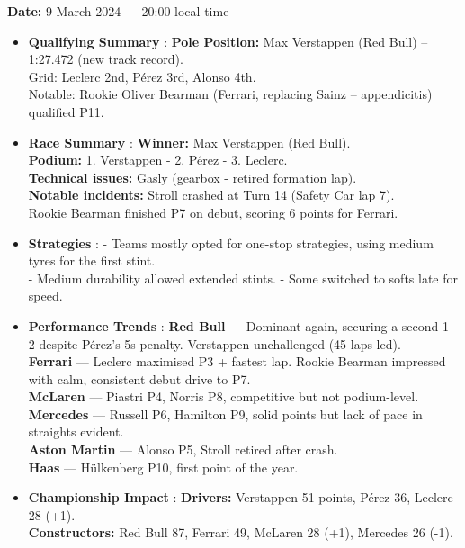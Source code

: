 \textbf{Date:} 9 March 2024 — 20:00 local time 

\begin{itemize}
    \item \textbf{Qualifying Summary} : \textbf{Pole Position:} Max Verstappen (Red Bull) – 1:27.472 (new track record). \\
    Grid: Leclerc 2nd, Pérez 3rd, Alonso 4th.\\
    Notable: Rookie Oliver Bearman (Ferrari, replacing Sainz – appendicitis) qualified P11.
    
    \item \textbf{Race Summary} : \textbf{Winner:} Max Verstappen (Red Bull). \\
    \textbf{Podium:} 1. Verstappen - 2. Pérez - 3. Leclerc.\\
    \textbf{Technical issues:} Gasly (gearbox - retired formation lap).\\
    \textbf{Notable incidents:} Stroll crashed at Turn 14 (Safety Car lap 7).\\
    Rookie Bearman finished P7 on debut, scoring 6 points for Ferrari.
    
    \item \textbf{Strategies} : 
    - Teams mostly opted for one-stop strategies, using medium tyres for the first stint.\\
    - Medium durability allowed extended stints. 
    - Some switched to softs late for speed.
    
    \item \textbf{Performance Trends} : \textbf{Red Bull} — Dominant again, securing a second 1–2 despite Pérez’s 5s penalty. Verstappen unchallenged (45 laps led). \\
    \textbf{Ferrari} — Leclerc maximised P3 + fastest lap. Rookie Bearman impressed with calm, consistent debut drive to P7. \\
    \textbf{McLaren} — Piastri P4, Norris P8, competitive but not podium-level. \\
    \textbf{Mercedes} — Russell P6, Hamilton P9, solid points but lack of pace in straights evident. \\
    \textbf{Aston Martin} — Alonso P5, Stroll retired after crash. \\
    \textbf{Haas} — Hülkenberg P10, first point of the year. 
    
    \item \textbf{Championship Impact} : \textbf{Drivers:} Verstappen 51 points, Pérez 36, Leclerc 28 (+1).\\
    \textbf{Constructors:} Red Bull 87, Ferrari 49, McLaren 28 (+1), Mercedes 26 (-1).    
\end{itemize}

